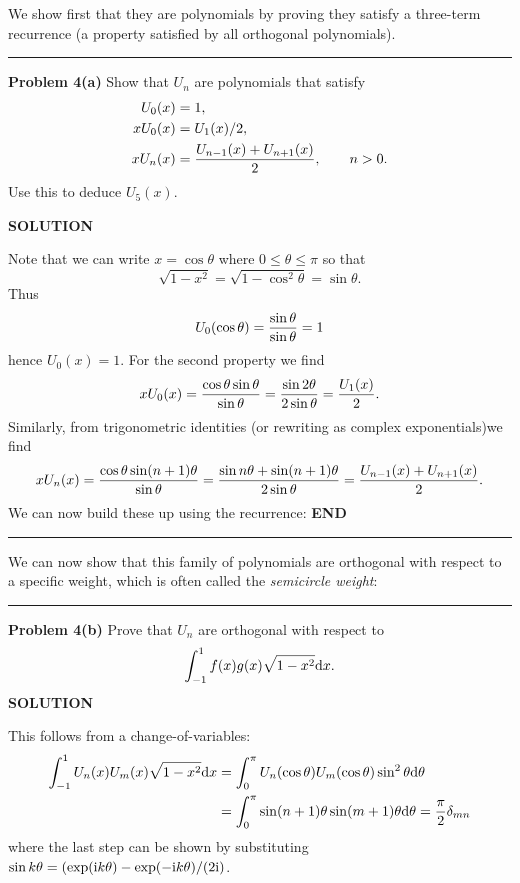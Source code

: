 \documentclass[12pt,a4paper]{article}
\begin{document}
We show first  that they are polynomials by proving they satisfy a three-term recurrence (a property satisfied by all orthogonal polynomials).

\rule{\textwidth}{1pt}
\textbf{Problem 4(a)} Show that $U_n$ are polynomials that satisfy
\begin{align*}
U_0(x) &= 1, \\
x U_0(x) &= U_1(x)/2, \\
x U_n(x) &= {U_{n-1}(x)+U_{n+1}(x) \over 2}, \qquad n > 0.
\end{align*}
Use this to deduce $U_5(x)$.

\textbf{SOLUTION}

Note that we can write $x = \cos \ensuremath{\theta}$ where $0 \ensuremath{\leq} \ensuremath{\theta} \ensuremath{\leq} \ensuremath{\pi}$ so that
\[
\sqrt{1-x^2} = \sqrt{1-\cos^2 \ensuremath{\theta}} = \sin \ensuremath{\theta}.
\]
Thus
\[
U_0(\cos \ensuremath{\theta}) = {\sin \ensuremath{\theta} \over \sin \ensuremath{\theta}} = 1
\]
hence $U_0(x) = 1$. For the second property we find
\[
x U_0(x) = {\cos \ensuremath{\theta} \sin \ensuremath{\theta} \over \sin \ensuremath{\theta}} = {\sin 2 \ensuremath{\theta} \over 2 \sin \ensuremath{\theta}} = {U_1(x) \over 2}.
\]
Similarly, from trigonometric identities (or rewriting as complex exponentials)we find
\[
x U_n(x) = {\cos \ensuremath{\theta}\sin(n+1)\ensuremath{\theta} \over \sin \ensuremath{\theta}} = {\sin n \ensuremath{\theta} + \sin (n+1) \ensuremath{\theta} \over 2 \sin \ensuremath{\theta}} = {U_{n-1}(x) + U_{n+1}(x) \over 2}.
\]
We can now build these up using the recurrence:
\textbf{END}

\rule{\textwidth}{1pt}
We can now show that this family of polynomials are orthogonal with respect to a specific weight, which is often called the \emph{semicircle weight}:

\rule{\textwidth}{1pt}
\textbf{Problem 4(b)} Prove that $U_n$ are orthogonal  with respect to
\[
\int_{-1}^1 f(x) g(x) \sqrt{1-x^2} {\rm d} x.
\]
\textbf{SOLUTION}

This follows from a change-of-variables:
\begin{align*}
\int_{-1}^1 U_n(x)U_m(x)\sqrt{1-x^2}{\rm d}x &= \int_0^{\ensuremath{\pi}}U_n(\cos \ensuremath{\theta})U_m(\cos \ensuremath{\theta})\sin^2 \ensuremath{\theta}{\rm d} \ensuremath{\theta} \\
&= \int_0^{\ensuremath{\pi}}\sin(n+1) \ensuremath{\theta}\sin(m+1) \ensuremath{\theta}{\rm d} \ensuremath{\theta}=\frac{\ensuremath{\pi}}{2}\ensuremath{\delta}_{mn}
\end{align*}
where the last step can be shown by substituting $\sin k\theta = (\exp({\rm i} k\theta)-\exp(-{\rm i} k\theta)/(2{\rm i})$.
\end{document}
